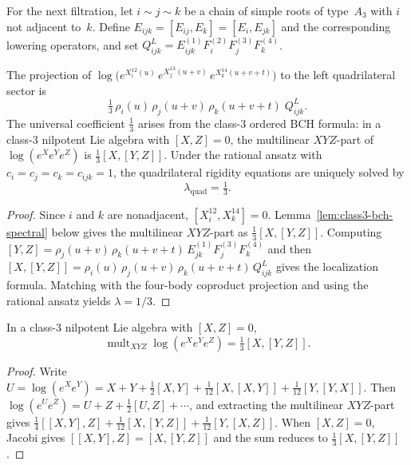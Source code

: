 For the next filtration, let $i \sim j \sim k$ be a chain
of simple roots of type~$A_3$ with $i$ not adjacent to~$k$.
Define $E_{ijk} = [E_{ij}, E_k] = [E_i, E_{jk}]$ and the
corresponding lowering operators, and set
$Q_{ijk}^L = E_{ijk}^{(1)} F_i^{(2)} F_j^{(3)} F_k^{(4)}$.

\begin{theorem}
\label{thm:spectral-quadrilateral-localization}
The projection of
$\log\bigl(e^{X_i^{12}(u)}\, e^{X_j^{13}(u+v)}\,
e^{X_k^{14}(u+v+t)}\bigr)$
to the left quadrilateral sector is
\[
 \tfrac{1}{3}\,\rho_i(u)\,\rho_j(u+v)\,\rho_k(u+v+t)
 \;Q_{ijk}^L.
\]
The universal coefficient $\frac{1}{3}$ arises from the
class-$3$ ordered BCH formula: in a class-$3$ nilpotent Lie
algebra with $[X,Z] = 0$, the multilinear $XYZ$-part of
$\log(e^X e^Y e^Z)$ is $\frac{1}{3}[X,[Y,Z]]$. Under the
rational ansatz with $c_i = c_j = c_k = c_{ijk} = 1$, the
quadrilateral rigidity equations are uniquely solved by
\[
 \boxed{\;\lambda_{\mathrm{quad}} = \tfrac{1}{3}.\;}
\]
\end{theorem}

\begin{proof}
Since $i$ and $k$ are nonadjacent, $[X_i^{12}, X_k^{14}] = 0$.
Lemma~\ref{lem:class3-bch-spectral} below gives the
multilinear $XYZ$-part as $\frac{1}{3}[X,[Y,Z]]$. Computing
$[Y,Z] = \rho_j(u+v)\,\rho_k(u+v+t)\,E_{jk}^{(1)}
F_j^{(3)} F_k^{(4)}$ and then
$[X,[Y,Z]] = \rho_i(u)\,\rho_j(u+v)\,\rho_k(u+v+t)\,Q_{ijk}^L$
gives the localization formula. Matching with the four-body
coproduct projection and using the rational ansatz yields
$\lambda = 1/3$.
\end{proof}

\begin{lemma}
\label{lem:class3-bch-spectral}
In a class-$3$ nilpotent Lie algebra with $[X,Z] = 0$,
\[
 \operatorname{mult}_{XYZ}\log(e^X e^Y e^Z)
 = \tfrac{1}{3}[X,[Y,Z]].
\]
\end{lemma}

\begin{proof}
Write $U = \log(e^X e^Y) = X + Y + \frac{1}{2}[X,Y]
+ \frac{1}{12}[X,[X,Y]] + \frac{1}{12}[Y,[Y,X]]$.
Then $\log(e^U e^Z) = U + Z + \frac{1}{2}[U,Z] + \cdots$,
and extracting the multilinear $XYZ$-part gives
$\frac{1}{4}[[X,Y],Z] + \frac{1}{12}[X,[Y,Z]]
+ \frac{1}{12}[Y,[X,Z]]$.
When $[X,Z] = 0$, Jacobi gives $[[X,Y],Z] = [X,[Y,Z]]$ and
the sum reduces to $\frac{1}{3}[X,[Y,Z]]$.
\end{proof}


